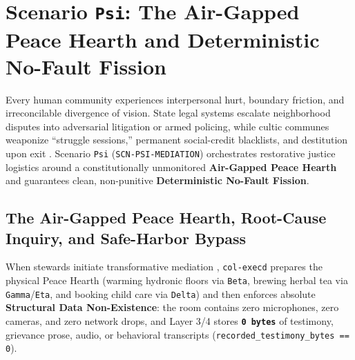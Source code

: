 \section{Scenario \texttt{Psi}: The Air-Gapped Peace Hearth and Deterministic No-Fault Fission}
\label{sec:scn-psi}

Every human community experiences interpersonal hurt, boundary friction, and irreconcilable divergence of vision. State legal systems escalate
neighborhood disputes into adversarial litigation or armed policing, while cultic communes weaponize ``struggle sessions,'' permanent social-credit
blacklists, and destitution upon exit \parencite{zehr1990,hirschman1970,scott1998}. Scenario \texttt{Psi} (\texttt{SCN-PSI-MEDIATION}) orchestrates
restorative justice logistics around a constitutionally unmonitored \textbf{Air-Gapped Peace Hearth} and guarantees clean, non-punitive
\textbf{Deterministic No-Fault Fission}.

\subsection{The Air-Gapped Peace Hearth, Root-Cause Inquiry, and Safe-Harbor Bypass}

When stewards initiate transformative mediation \parencite{zehr1990}, \texttt{col-execd} prepares the physical Peace Hearth (warming hydronic floors via
\texttt{Beta}, brewing herbal tea via \texttt{Gamma}/\texttt{Eta}, and booking child care via \texttt{Delta}) and then enforces absolute
\textbf{Structural Data Non-Existence}: the room contains zero microphones, zero cameras, and zero network drops, and Layer 3/4 stores \textbf{\texttt{0
bytes}} of testimony, grievance prose, audio, or behavioral transcripts (\texttt{recorded\_testimony\_bytes == 0}).

